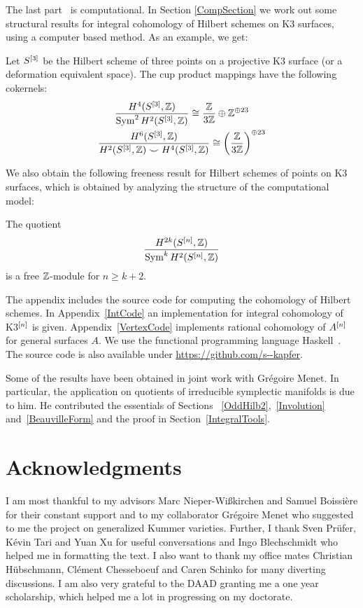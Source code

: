 The last part~\cite{Kapfer2} is computational. In Section \ref{CompSection} we work out some structural results for integral cohomology of Hilbert schemes on K3 surfaces, using a computer based method. As an example, we get:
{
\renewcommand{\thetheorem}{\!\!s \ref{p22} and \ref{p24}}
\begin{proposition}
Let $S^{[3]}$ be the Hilbert scheme of three points on a projective K3 surface (or a deformation equivalent space).
The cup product mappings have the following cokernels:
\begin{gather*}
\frac{H^4(S^{[3]},\mathbb{Z})}{\operatorname{Sym}^2 H^2(S^{[3]},\mathbb{Z})}  \cong \frac{\mathbb{Z}}{3\mathbb{Z}} \oplus \mathbb{Z}^ {\oplus 23}\\
\frac{H^6(S^{[3]},\mathbb{Z})}{H^2(S^{[3]},\mathbb{Z})\smile H^4(S^{[3]},\mathbb{Z})} \cong \left(\frac{\mathbb{Z}}{3\mathbb{Z}}\right)^{\oplus 23}
\end{gather*}
\end{proposition}
\addtocounter{theorem}{-1}
}
We also obtain the following freeness result for Hilbert schemes of points on K3 surfaces, which is obtained by analyzing the structure of the computational model:
{
\renewcommand{\thetheorem}{\ref{freeness}}
\begin{theorem}
The quotient
$$
 \frac{H^{2k}(S^{[n]},\mathbb{Z})}{\operatorname{Sym}^k H^{2}(S^{[n]},\mathbb{Z})}
$$
is a free $\mathbb{Z}$-module for $n\geq k+2$.
\end{theorem}
\addtocounter{theorem}{-1}
}
The appendix includes the source code for computing the cohomology of Hilbert schemes. In Appendix~\ref{IntCode} an implementation for integral cohomology of K3$^{[n]}$ is given. 
Appendix~\ref{VertexCode} implements rational cohomology of $A^{[n]}$ for general surfaces $A$. 
We use the functional programming language Haskell~\cite{haskell98}. 
The source code is also available under \url{https://github.com/s--kapfer}.
\vspace{5pt}

Some of the results have been obtained in joint work with Gr\'egoire Menet. In particular, the application on quotients of irreducible symplectic manifolds is due to him.
He contributed the essentials of Sections~ \ref{OddHilb2},~\ref{Involution} and~\ref{BeauvilleForm} and the proof in Section~\ref{IntegralTools}.

\section{Acknowledgments}
I am most thankful to my advisors Marc Nieper-Wi\ss\-kir\-chen and Samuel Boissi\`ere for their constant support
and to my collaborator Gr\'egoire Menet who suggested to me the project on generalized Kummer varieties.
Further, I thank Sven Pr\"ufer, K\'evin Tari and Yuan Xu for useful conversations and
 Ingo Blechschmidt who helped me in formatting the text.
I also want to thank my office mates Christian H\"ubschmann, Cl\'ement Chesseboeuf and Caren Schinko for many diverting discussions.
I am also very grateful to the DAAD granting me a one year scholarship, which helped me a lot in progressing on my doctorate. 
